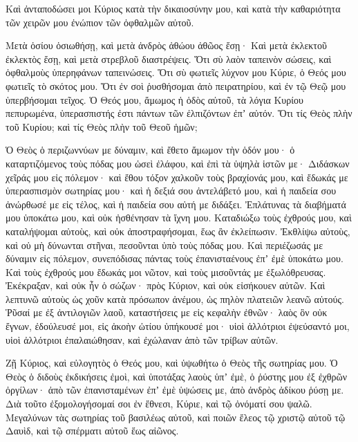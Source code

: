 {Καὶ ἀνταποδώσει μοι Κύριος κατὰ τὴν δικαιοσύνην μου, καὶ κατὰ τὴν καθαριότητα τῶν χειρῶν μου ἐνώπιον τῶν ὀφθαλμῶν αὐτοῦ.
\par }{\PP {}Μετὰ ὁσίου ὁσιωθήσῃ, καὶ μετὰ ἀνδρὸς ἀθώου ἀθῶος ἔσῃ·
Καὶ μετὰ ἐκλεκτοῦ ἐκλεκτὸς ἔσῃ, καὶ μετὰ στρεβλοῦ διαστρέψεις.
Ὅτι σὺ λαὸν ταπεινὸν σώσεις, καὶ ὀφθαλμοὺς ὑπερηφάνων ταπεινώσεις.
Ὅτι σὺ φωτιεῖς λύχνον μου Κύριε, ὁ Θεός μου φωτιεῖς τὸ σκότος μου.
Ὅτι ἐν σοὶ ῥυσθήσομαι ἀπὸ πειρατηρίου, καὶ ἐν τῷ Θεῷ μου ὑπερβήσομαι τεῖχος.
Ὁ Θεός μου, ἄμωμος ἡ ὁδὸς αὐτοῦ, τὰ λόγια Κυρίου πεπυρωμένα, ὑπερασπιστής ἐστι πάντων τῶν ἐλπιζόντων ἐπʼ αὐτόν.
Ὅτι τίς Θεὸς πλὴν τοῦ Κυρίου; καὶ τίς Θεὸς πλὴν τοῦ Θεοῦ ἡμῶν;
\par }{\PP {}Ὁ Θεὸς ὁ περιζωννύων με δύναμιν, καὶ ἔθετο ἄμωμον τὴν ὁδόν μου·
ὁ καταρτιζόμενος τοὺς πόδας μου ὡσεὶ ἐλάφου, καὶ ἐπὶ τὰ ὑψηλὰ ἱστῶν με·
Διδάσκων χεῖράς μου εἰς πόλεμον· καὶ ἔθου τόξον χαλκοῦν τοὺς βραχίονάς μου,
καὶ ἔδωκάς με ὑπερασπισμὸν σωτηρίας μου· καὶ ἡ δεξιά σου ἀντελάβετό μου, καὶ ἡ παιδεία σου ἀνώρθωσέ με εἰς τέλος, καὶ ἡ παιδεία σου αὐτή με διδάξει.
Ἐπλάτυνας τὰ διαβήματά μου ὑποκάτω μου, καὶ οὐκ ἠσθένησαν τὰ ἴχνη μου.
Καταδιώξω τοὺς ἐχθρούς μου, καὶ καταλήψομαι αὐτοὺς, καὶ οὐκ ἀποστραφήσομαι, ἕως ἂν ἐκλείπωσιν.
Ἐκθλίψω αὐτοὺς, καὶ οὐ μὴ δύνωνται στῆναι, πεσοῦνται ὑπὸ τοὺς πόδας μου.
Καὶ περιέζωσάς με δύναμιν εἰς πόλεμον, συνεπόδισας πάντας τοὺς ἐπανισταένους ἐπʼ ἐμὲ ὑποκάτω μου.
Καὶ τοὺς ἐχθρούς μου ἔδωκάς μοι νῶτον, καὶ τοὺς μισοῦντάς με ἐξωλόθρευσας.
Ἐκέκραξαν, καὶ οὐκ ἦν ὁ σώζων· πρὸς Κύριον, καὶ οὐκ εἰσήκουεν αὐτῶν.
Καὶ λεπτυνῶ αὐτοὺς ὡς χοῦν κατὰ πρόσωπον ἀνέμου, ὡς πηλὸν πλατειῶν λεανῶ αὐτούς.
Ῥῦσαί με ἐξ ἀντιλογιῶν λαοῦ, καταστήσεις με εἰς κεφαλὴν ἐθνῶν· λαὸς ὃν οὐκ ἔγνων, ἐδούλευσέ μοι,
εἰς ἀκοὴν ὠτίου ὑπήκουσέ μοι· υἱοὶ ἀλλότριοι ἐψεύσαντό μοι,
υἱοὶ ἀλλότριοι ἐπαλαιώθησαν, καὶ ἐχώλαναν ἀπὸ τῶν τρίβων αὐτῶν.
\par }{\PP {}Ζῇ Κύριος, καὶ εὐλογητὸς ὁ Θεός μου, καὶ ὑψωθήτω ὁ Θεὸς τῆς σωτηρίας μου.
Ὁ Θεὸς ὁ διδοὺς ἐκδικήσεις ἐμοὶ, καὶ ὑποτάξας λαοὺς ὑπʼ ἐμὲ,
ὁ ῥύστης μου ἐξ ἐχθρῶν ὀργίλων· ἀπὸ τῶν ἐπανισταμένων ἐπʼ ἐμὲ ὑψώσεις με, ἀπὸ ἀνδρὸς ἀδίκου ῥύσῃ με.
Διὰ τοῦτο ἐξομολογήσομαί σοι ἐν ἔθνεσι, Κύριε, καὶ τῷ ὀνόματί σου ψαλῶ.
Μεγαλύνων τὰς σωτηρίας τοῦ βασιλέως αὐτοῦ, καὶ ποιῶν ἔλεος τῷ χριστῷ αὐτοῦ τῷ Δαυὶδ, καὶ τῷ σπέρματι αὐτοῦ ἕως αἰῶνος.

}
